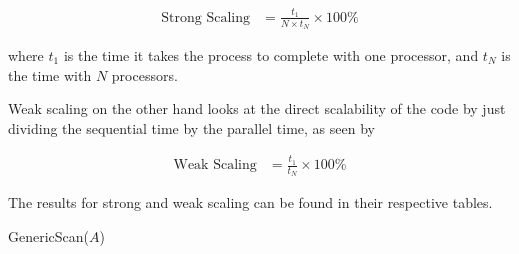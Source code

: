 \documentclass[addpoints]{exam}
\begin{document}
\begin{questions}
\begin{solution}
\begin{align}
\text{Strong Scaling} &= \frac{t_{1}}{N\times t_{N}}\times 100\%\label{eq:strong}
\end{align}

where $t_{1}$ is the time it takes the process to complete with one processor, and $t_{N}$ is the time with $N$ processors. 

Weak scaling on the other hand looks at the direct scalability of the code by just dividing the sequential time by the parallel time, as seen by

\begin{align}
\text{Weak Scaling} &= \frac{t_{1}}{t_{N}}\times 100\%\label{eq:weak}
\end{align}

The results for strong and weak scaling can be found in their respective tables.

\begin{algorithm}[H]
\caption{GenericScan($A$)}
\begin{algorithmic}[1]
    \ENDFOR
\ENDFOR
{}

    \ENDFOR
\ENDFOR
{}
\end{algorithmic}
\end{algorithm}


\end{solution}
\end{questions}
\end{document}
